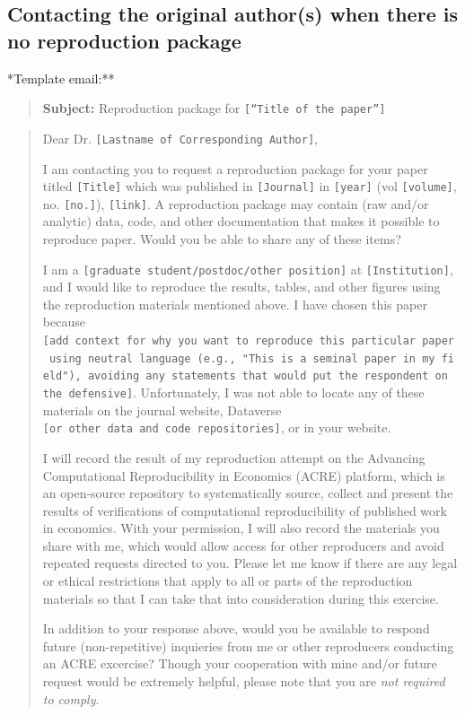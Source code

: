 \documentclass[]{book}
\begin{document}
\hypertarget{contacting-the-original-authors-when-there-is-no-reproduction-package}{%
\subsection{Contacting the original author(s) when there is no reproduction package}\label{contacting-the-original-authors-when-there-is-no-reproduction-package}}

*Template email:**

\begin{quote}
\textbf{Subject:} Reproduction package for \texttt{{[}“Title\ of\ the\ paper”{]}}
\end{quote}

\begin{quote}
Dear Dr. \texttt{{[}Lastname\ of\ Corresponding\ Author{]}},

I am contacting you to request a reproduction package for your paper titled \texttt{{[}Title{]}} which was published in \texttt{{[}Journal{]}} in \texttt{{[}year{]}} (vol \texttt{{[}volume{]}}, no. \texttt{{[}no.{]}}), \texttt{{[}link{]}}. A reproduction package may contain (raw and/or analytic) data, code, and other documentation that makes it possible to reproduce paper. Would you be able to share any of these items?

I am a \texttt{{[}graduate\ student/postdoc/other\ position{]}} at \texttt{{[}Institution{]}}, and I would like to reproduce the results, tables, and other figures using the reproduction materials mentioned above. I have chosen this paper because \texttt{{[}add\ context\ for\ why\ you\ want\ to\ reproduce\ this\ particular\ paper\ using\ neutral\ language\ (e.g.,\ "This\ is\ a\ seminal\ paper\ in\ my\ field"),\ avoiding\ any\ statements\ that\ would\ put\ the\ respondent\ on\ the\ defensive{]}}. Unfortunately, I was not able to locate any of these materials on the journal website, Dataverse \texttt{{[}or\ other\ data\ and\ code\ repositories{]}}, or in your website.

I will record the result of my reproduction attempt on the Advancing Computational Reproducibility in Economics (ACRE) platform, which is an open-source repository to systematically source, collect and present the results of verifications of computational reproducibility of published work in economics. With your permission, I will also record the materials you share with me, which would allow access for other reproducers and avoid repeated requests directed to you. Please let me know if there are any legal or ethical restrictions that apply to all or parts of the reproduction materials so that I can take that into consideration during this exercise.

In addition to your response above, would you be available to respond future (non-repetitive) inquieries from me or other reproducers conducting an ACRE excercise? Though your cooperation with mine and/or future request would be extremely helpful, please note that you are \emph{not required to comply}.
\end{quote}
\end{document}
